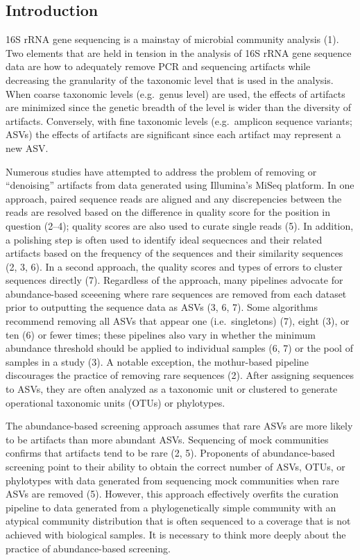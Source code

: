 \documentclass[
]{article}
\begin{document}
\newpage

\hypertarget{introduction}{%
\subsection{Introduction}\label{introduction}}

16S rRNA gene sequencing is a mainstay of microbial community analysis
(1). Two elements that are held in tension in the analysis of 16S rRNA
gene sequence data are how to adequately remove PCR and sequencing
artifacts while decreasing the granularity of the taxonomic level that
is used in the analysis. When coarse taxonomic levels (e.g.~genus level)
are used, the effects of artifacts are minimized since the genetic
breadth of the level is wider than the diversity of artifacts.
Conversely, with fine taxonomic levels (e.g.~amplicon sequence variants;
ASVs) the effects of artifacts are significant since each artifact may
represent a new ASV.

Numerous studies have attempted to address the problem of removing or
``denoising'' artifacts from data generated using Illumina's MiSeq
platform. In one approach, paired sequence reads are aligned and any
discrepencies between the reads are resolved based on the difference in
quality score for the position in question (2--4); quality scores are
also used to curate single reads (5). In addition, a polishing step is
often used to identify ideal sequecnces and their related artifacts
based on the frequency of the sequences and their similarity sequences
(2, 3, 6). In a second approach, the quality scores and types of errors
to cluster sequences directly (7). Regardless of the approach, many
pipelines advocate for abundance-based sceeening where rare sequences
are removed from each dataset prior to outputting the sequence data as
ASVs (3, 6, 7). Some algorithms recommend removing all ASVs that appear
one (i.e.~singletons) (7), eight (3), or ten (6) or fewer times; these
pipelines also vary in whether the minimum abundance threshold should be
applied to individual samples (6, 7) or the pool of samples in a study
(3). A notable exception, the mothur-based pipeline discourages the
practice of removing rare sequences (2). After assigning sequences to
ASVs, they are often analyzed as a taxonomic unit or clustered to
generate operational taxonomic units (OTUs) or phylotypes.

The abundance-based screening approach assumes that rare ASVs are more
likely to be artifacts than more abundant ASVs. Sequencing of mock
communities confirms that artifacts tend to be rare (2, 5). Proponents
of abundance-based screening point to their ability to obtain the
correct number of ASVs, OTUs, or phylotypes with data generated from
sequencing mock communities when rare ASVs are removed (5). However,
this approach effectively overfits the curation pipeline to data
generated from a phylogenetically simple community with an atypical
community distribution that is often sequenced to a coverage that is not
achieved with biological samples. It is necessary to think more deeply
about the practice of abundance-based screening.
\end{document}
